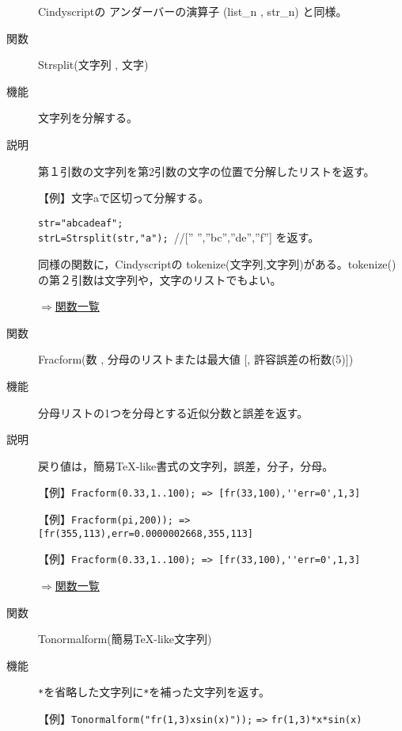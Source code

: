 \documentclass[papersize,a4paper,10pt,uplatex]{jsarticle}
\begin{document}
\begin{description}
Cindyscriptの アンダーバーの演算子 (list\_n , str\_n) と同様。

\vspace{\baselineskip}
\hypertarget{strsplit}{}
\item[関数]Strsplit(文字列 , 文字)
\item[機能]文字列を分解する。
\item[説明]第１引数の文字列を第2引数の文字の位置で分解したリストを返す。

\vspace{\baselineskip}
【例】文字aで区切って分解する。

\verb|str="abcadeaf";| \\
\verb|strL=Strsplit(str,"a"); |//[” ”,”bc”,”de”,”f”] を返す。

同様の関数に，Cindyscriptの tokenize(文字列,文字列)がある。tokenize() の第２引数は文字列や，文字のリストでもよい。

\begin{flushright}\hyperlink{functionlist}{$\Rightarrow$関数一覧}\end{flushright}

\vspace{\baselineskip}
\hypertarget{fracform}{}
\item[関数]Fracform(数 , 分母のリストまたは最大値 [, 許容誤差の桁数(5)])
\item[機能]分母リストの1つを分母とする近似分数と誤差を返す。
\item[説明]戻り値は，簡易TeX-like書式の文字列，誤差，分子，分母。

\vspace{\baselineskip}
【例】\verb|Fracform(0.33,1..100); => [fr(33,100),''err=0',1,3]|

【例】\verb|Fracform(pi,200)); => [fr(355,113),err=0.0000002668,355,113]|

【例】\verb|Fracform(0.33,1..100); => [fr(33,100),''err=0',1,3]|

\begin{flushright}\hyperlink{functionlist}{$\Rightarrow$関数一覧}\end{flushright}

\vspace{\baselineskip}
\hypertarget{tonormalform}{}
\item[関数]Tonormalform(簡易TeX-like文字列)
\item[機能]\verb|*|を省略した文字列に\verb|*|を補った文字列を返す。

\vspace{\baselineskip}
【例】\verb|Tonormalform("fr(1,3)xsin(x)"));| \verb|=>| \verb|fr(1,3)*x*sin(x)|


\end{description}
\end{document}
